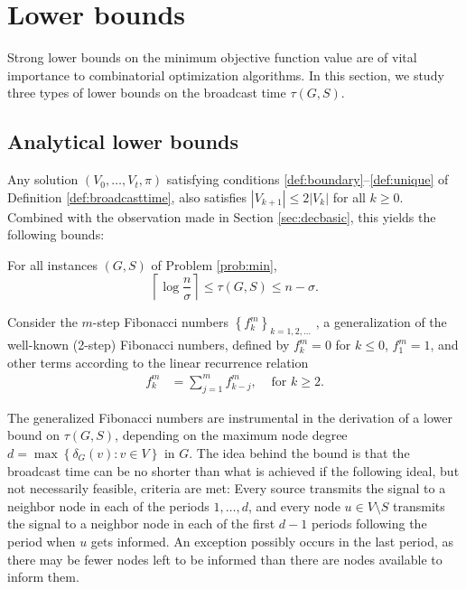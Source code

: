 \section{Lower bounds} \label{sec:lb}
Strong lower bounds on the minimum objective function value are of vital importance to combinatorial optimization algorithms.
In this section, we study three types of lower bounds on the broadcast time $\tau(G,S)$.

\subsection{Analytical lower bounds} \label{sec:lbanalyt}
Any solution $\left(V_0,\ldots,V_t,\pi\right)$ satisfying conditions \ref{def:boundary}--\ref{def:unique} of Definition \ref{def:broadcasttime},
also satisfies $\left|V_{k+1}\right|\leq 2\left|V_k\right|$ for all $k\geq 0$.
Combined with the observation made in Section \ref{sec:decbasic}, this yields the following bounds:
\begin{observation}
For all instances $(G,S)$ of Problem \ref{prob:min},
\begin{equation}
\left\lceil\log\frac{n}{\sigma}\right\rceil\leq \tau(G,S) \leq n-\sigma.
\label{eq:loglb}
\end{equation}
\label{obs:loglb}
\end{observation}

Consider the $m$-step Fibonacci numbers $\left\{f^{m}_k\right\}_{k=1,2,\ldots}$ \cite{noe05}, a generalization of the well-known (2-step) Fibonacci numbers, defined by
$f^{m}_k=0$ for $k\leq 0$, $f^{m}_1=1$, and 
other terms according to the linear recurrence relation 
\begin{align*}
f^{m}_k &=\sum\limits_{j=1}^m f^{m}_{k-j}, &\text{ for } k\geq 2.
\end{align*}

The generalized Fibonacci numbers are instrumental in the derivation of a lower bound on $\tau(G,S)$,
depending on the maximum node degree $d=\max\left\{\delta_G(v): v\in V\right\}$ in $G$.
The idea behind the bound is that the broadcast time can be no shorter than what is achieved if
the following ideal, but not necessarily feasible, criteria are met:
Every source transmits the signal to a neighbor node in each of the periods $1,\ldots,d$,
and every node $u\in V\setminus S$
transmits the signal to a neighbor node in each of the first $d-1$ periods following the period when $u$ gets informed.
An exception possibly occurs in the last period, as there may be fewer nodes left to be informed than there are nodes available to inform them.

